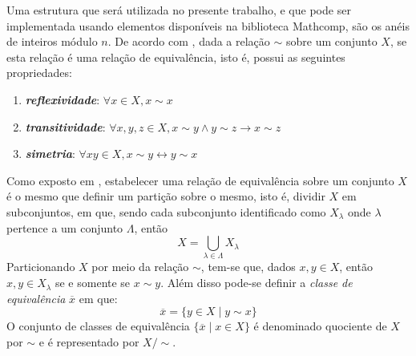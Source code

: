 Uma estrutura que será utilizada no presente trabalho, e que pode ser implementada usando elementos disponíveis na biblioteca Mathcomp, são os anéis de inteiros módulo $n$. De acordo com \cite{book:2399854}, dada a relação $\sim$ sobre um conjunto $X$, se esta relação é uma relação de equivalência, isto é, possui as seguintes propriedades:
\begin{enumerate}
    \item \textbf{\textit{reflexividade}}: $\forall x \in X, x \sim x$
    \item \textbf{\textit{transitividade}}: $\forall x, y, z \in X, x \sim y \land y \sim z \rightarrow x \sim z$
    \item \textbf{\textit{simetria}}: $\forall x y \in X, x \sim y \leftrightarrow y \sim x$
\end{enumerate}
Como exposto em \cite{book:2399854}, estabelecer uma relação de equivalência sobre um conjunto $X$ é o mesmo que definir um partição sobre o mesmo, isto é, dividir $X$ em subconjuntos, em que, sendo cada subconjunto identificado como $X_\lambda$ onde $\lambda$ pertence a um conjunto $\Lambda$, então
\begin{equation*}
    X = \bigcup_{\lambda \in \Lambda} X_{\lambda}
\end{equation*}
Particionando $X$ por meio da relação $\sim$, tem-se que, dados $x, y \in X$, então $x, y \in X_\lambda$ se e somente se $x \sim y$. Além disso pode-se definir a \textit{classe de equivalência} $\overline{x}$ em que:
\begin{equation*}
    \overline{x} = \{y \in X \mid y \sim x \}
\end{equation*}
O conjunto de classes de equivalência $\{\overline{x} \mid x \in X\}$ é denominado quociente de $X$ por $\sim$ e é representado por $X/\sim$.

